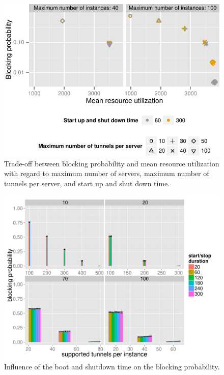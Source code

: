 \begin{figure}[htb]
  \centering
  \includegraphics{images/compare-util-block.pdf}
  \caption{Trade-off between blocking probability and mean resource utilization with regard to maximum number of servers, maximum number of tunnels per server, and start up and shut down time.}
 \label{c4:fig:compare_util_block}
\end{figure}


\begin{figure}[htb]
  \centering
  \includegraphics[width=1.0\textwidth]{images/startstopduration-blockingprobability-barchart.pdf}
  \caption{Influence of the boot and shutdown time on the blocking probability.}
 \label{c4:fig:blockprob-startstop-barchart}
\end{figure}

